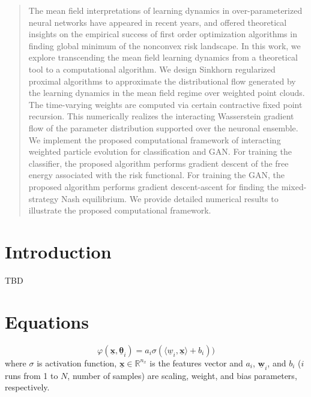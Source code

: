 \documentclass{article}
\newcommand{\bx}{{\bm{x}}}
\begin{document}
\printAffiliationsAndNotice{\icmlEqualContribution} %

\begin{abstract}
 The mean field interpretations of learning dynamics in over-parameterized neural networks have appeared in recent years, and offered theoretical insights on the empirical success of first order optimization algorithms in finding global minimum of the nonconvex risk landscape. In this work, we explore transcending the mean field learning dynamics from a theoretical tool to a computational algorithm. We design Sinkhorn regularized proximal algorithms to approximate the distributional flow generated by the learning dynamics in the mean field regime over weighted point clouds. The time-varying weights are computed via certain contractive fixed point recursion. This numerically realizes the interacting Wasserstein gradient flow of the parameter distribution supported over the neuronal ensemble. We implement the proposed computational framework of interacting weighted particle evolution for classification and GAN. For training the classifier, the proposed algorithm performs gradient descent of the free energy associated with the risk functional. For training the GAN, the proposed algorithm performs gradient descent-ascent for finding the mixed-strategy Nash equilibrium. We provide detailed numerical results to illustrate the proposed computational framework.
\end{abstract}

\section{Introduction}
\label{introduction}
TBD
\section{Equations}

\begin{equation}
\label{phi}
    \varphi(\underline{\bx},\underline{\bm{\bm{\theta}}}_{i})=a_{i} \sigma(\langle \underline{w}_{i},\underline{\bx} \rangle +b_i))
\end{equation}
 where $\sigma$ is activation function, $\underline{\bx} \in \mathbb{R}^{n_{x}}$ is the features vector and $a_{i}$, $\underline{\bm{w}}_{i}$, and $b_{i}$ ($i$ runs from 1 to $N$, number of samples) are scaling, weight, and bias parameters, respectively. 
 
\end{document}
